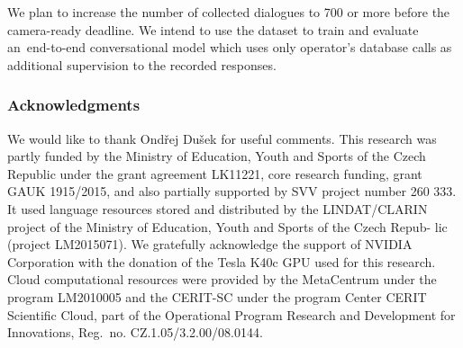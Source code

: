 \documentclass[runningheads,a4paper]{llncs}
\newcommand{\commentontext}[2]{\colorbox{yellow!60}{#1}\pdfcomment[color={0.234 0.867 0.211},hoffset=-6pt,voffset=10pt,opacity=0.5]{#2}}
\begin{document}
We plan to increase the number of collected dialogues to 700 or more before the camera-ready deadline.
We intend to use the dataset to train and evaluate an~end-to-end conversational model which uses only operator's database calls as additional supervision to the recorded responses. 

\vspace{-1.40em}
\subsubsection*{Acknowledgments}
We would like to thank Ondřej Dušek for useful comments.
This research was partly funded by the Ministry of Education, Youth and Sports of the Czech Republic under the grant agreement LK11221, core research funding, grant GAUK 1915/2015, and also partially supported by SVV project number 260 333.
It used language resources stored and distributed by the LINDAT/CLARIN project of the Ministry of Education, Youth and Sports of the Czech Repub- lic (project LM2015071).
We gratefully acknowledge the support of NVIDIA Corporation with the donation of the Tesla K40c GPU used for this research.
Cloud computational resources were provided by the MetaCentrum under the program LM2010005 and the CERIT-SC under the program Center CERIT Scientific Cloud, part of the Operational Program Research and Development for Innovations, Reg.\ no. CZ.1.05/3.2.00/08.0144.

%
%
%
%
%
%


\vspace{-1.00em}



\end{document}
